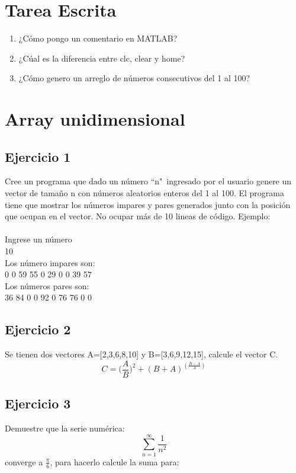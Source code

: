 \documentclass{article}
\begin{document}
\section{Tarea Escrita}
	\begin{enumerate}		
	\item 	¿Cómo pongo un comentario en MATLAB?
	\item	¿Cúal es la diferencia entre clc, clear y home?
	\item	¿Cómo genero un arreglo de números consecutivos del 1 al 100?
	\end{enumerate}

\section{Array unidimensional}
	\subsection{Ejercicio 1}
	Cree un programa que dado un número ``n"\ ingresado por el usuario genere un vector de tamaño n con números aleatorios enteros del 1 al 100. El programa tiene que mostrar los números impares y pares generados junto con la posición que ocupan en el vector. No ocupar más de 10 lineas de código. Ejemplo:\\\\
	
	Ingrese un número \\
	10\\
	Los número impares son: \\
	0     0    59    55     0    29     0     0    39    57\\
	Los números pares son:\\
	36    84     0     0    92     0    76    76     0     0\\
\subsection{Ejercicio 2}
Se tienen dos vectores A=[2,3,6,8,10] y B=[3,6,9,12,15], calcule el vector C.
\[
C=\Big(\frac{A}{B}\Big)^2 + (B+A)^{(\frac{B-A}{A})}
\]

\subsection{Ejercicio 3}

Demuestre que la serie numérica:
\[
	\sum_{n=1}^{\infty}\frac{1}{n^2}
\]
converge a $ \frac{\pi}{6} $, para hacerlo calcule la suma para:
\end{document}

